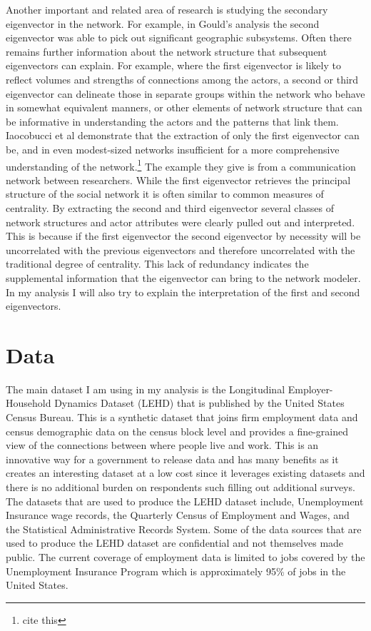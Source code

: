 \documentclass{article}
\theoremstyle{definition}
\theoremstyle{remark}
\begin{document}
Another important and related area of research is studying the secondary eigenvector in the network.  For example, in Gould’s analysis the second eigenvector was able to pick out significant geographic subsystems.  Often there remains further information about the network structure that subsequent eigenvectors can explain. For example, where the first eigenvector is likely to reflect volumes and strengths of connections among the actors, a second or third eigenvector can delineate those in separate groups within the network who behave in somewhat equivalent manners, or other elements of network structure that can be informative in understanding the actors and the patterns that link them. Iaocobucci et al demonstrate that the extraction of only the first eigenvector can be, and in even modest-sized networks insufficient for a more comprehensive understanding of the network.\footnote{cite this}  The example they give is from a communication network between researchers.  While the first eigenvector retrieves the principal structure of the social network it is often similar to common measures of centrality.  By extracting the second and third eigenvector several classes of network structures and actor attributes were clearly pulled out and interpreted.  This is because if the first eigenvector the second eigenvector by necessity will be uncorrelated with the previous eigenvectors and therefore uncorrelated with the traditional degree of centrality.  This lack of redundancy indicates the supplemental information that the eigenvector can bring to the network modeler.  In my analysis I will also try to explain the interpretation of the first and second eigenvectors.

\section{Data}
The main dataset I am using in my analysis is the Longitudinal Employer-Household Dynamics Dataset (LEHD) that is published by the United States Census Bureau.  This is a synthetic dataset that joins firm employment data and census demographic data on the census block level and provides a fine-grained view of the connections between where people live and work.  This is an innovative way for a government to release data and has many benefits as it creates an interesting dataset at a low cost since it leverages existing datasets and there is no additional burden on respondents such filling out additional surveys.  The datasets that are used to produce the LEHD dataset include, Unemployment Insurance wage records, the Quarterly Census of Employment and Wages, and the Statistical Administrative Records System.  Some of the data sources that are used to produce the LEHD dataset are confidential and not themselves made public.  The current coverage of employment data is limited to jobs covered by the Unemployment Insurance Program which is approximately 95\% of jobs in the United States.  \\
\end{document}

